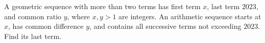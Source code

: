 A geometric sequence with more than two terms has first term $x$, last term $2023$, and common ratio $y$, where $x,y>1$ are integers. An arithmetic sequence starts at $x$, has common difference $y$, and contains all successive terms not exceeding $2023$. Find its last term.

